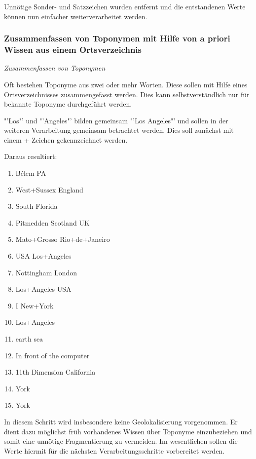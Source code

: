 				Unnötige Sonder- und Satzzeichen wurden entfernt und die entstandenen Werte können nun einfacher weiterverarbeitet werden.

			\subsubsection{Zusammenfassen von Toponymen mit Hilfe von a priori Wissen aus einem Ortsverzeichnis}

				\textit{Zusammenfassen von Toponymen}

				Oft bestehen Toponyme aus zwei oder mehr Worten.
				Diese sollen mit Hilfe eines Ortsverzeichnisses zusammengefasst werden. 
				Dies kann selbstverständlich nur für bekannte Toponyme durchgeführt werden.
				
				"'Los"' und "'Angeles"' bilden gemeinsam "'Los Angeles"' und sollen in der weiteren Verarbeitung gemeinsam betrachtet werden. 
				Dies soll zunächst mit einem + Zeichen gekennzeichnet werden.

				Daraus resultiert:

				\begin{multicols}{2}
					\begin{enumerate}
						\item Bélem PA
						\item West+Sussex England
						\item South Florida
						\item Pitmedden Scotland UK
						\item Mato+Grosso Rio+de+Janeiro
						\item USA Los+Angeles
						\item Nottingham London
						\item Los+Angeles USA
						\item I New+York 
						\item Los+Angeles
						\item earth sea
						\item In front of the computer
						\item 11th Dimension California
						\item York
						\item York
					\end{enumerate}
				\end{multicols}

				In diesem Schritt wird insbesondere keine Geolokalisierung vorgenommen. 
				Er dient dazu möglichst früh vorhandenes Wissen über Toponyme einzubeziehen und somit eine unnötige Fragmentierung zu vermeiden.
				Im wesentlichen sollen die Werte hiermit für die nächsten Verarbeitungsschritte vorbereitet werden.

